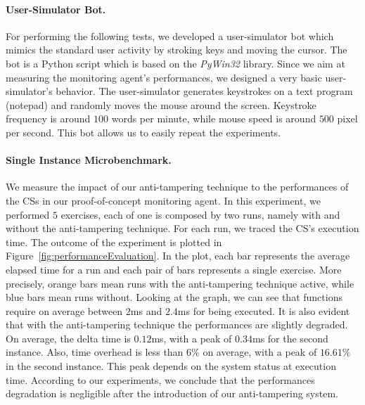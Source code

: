 \paragraph{User-Simulator Bot.}
For performing the following tests, we developed a user-simulator bot which 
mimics the standard user activity by stroking keys and moving the cursor.
The bot is a Python script which is based on the \emph{PyWin32} library. %
Since we aim at measuring the monitoring agent's performances, we designed a 
very basic user-simulator's behavior.
The user-simulator generates keystrokes on a text program (\ie notepad) and 
randomly moves the mouse around the screen.
Keystroke frequency is around $100$ words per minute, while mouse speed is 
around $500$ pixel per second.
This bot allows us to easily repeat the experiments.

\paragraph{Single Instance Microbenchmark.}
We measure the impact of our anti-tampering technique to the performances of 
the CSs in our proof-of-concept monitoring agent.
In this experiment, we performed $5$ exercises, each of one is composed by two 
runs, namely with and without the anti-tampering technique.
For each run, we traced the CS's execution time.
The outcome of the experiment is plotted in 
Figure~\ref{fig:performanceEvaluation}. %
In the plot, each bar represents the average elapsed time for a run and each 
pair of bars represents a single exercise. More precisely, orange bars
mean runs with the anti-tampering technique active, while blue bars mean runs 
without.
Looking at the graph, we can see that functions require on average between 
$2$ms and $2.4$ms for being executed.
It is also evident that with the anti-tampering technique the performances are 
slightly degraded.
On average, the delta time is $0.12$ms, with a peak of $0.34$ms for the second 
instance. 
Also, time overhead is less than $6\%$ on average, with a peak of $16.61\%$ in 
the second instance. 
This peak depends on the system status at execution time.
According to our experiments, we conclude that the performances degradation is 
negligible after the introduction of our anti-tampering system.

